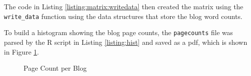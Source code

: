 The code in Listing \ref{listing:matrix:writedata} then created the matrix using the {\tt write\_data} function using the data structures that store the blog word counts.



To build a histogram showing the blog page counts, the {\tt pagecounts} file was parsed by the R script in Listing \ref{listing:hist} and saved as a pdf, which is shown in Figure \ref{fig:hist}.



\clearpage

\begin{figure}[h!]
\centering
{}
\caption{Page Count per Blog}
\label{fig:hist}
\end{figure}